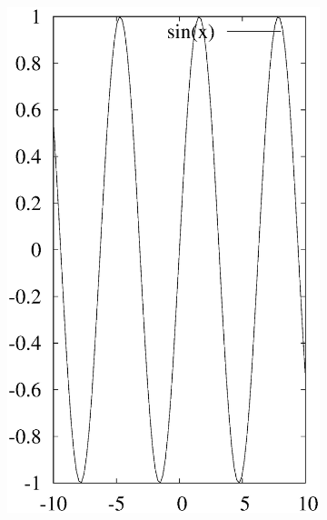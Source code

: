 \documentclass[journal=jacsat,manuscript=article]{achemso}
\begin{document}
\begin{figure}[ht]
\begin{subfigure}{0.3\textwidth}
\includegraphics [width=\textwidth]{sin.eps}

\end{subfigure}
\end{figure}
\end{document}
